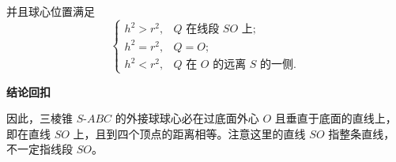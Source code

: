 \begin{proofbox}
	并且球心位置满足
	\[
		\begin{cases}
			h^{2}>r^{2}, & Q \text{ 在线段 } SO \text{ 上};               \\[4pt]
			h^{2}=r^{2}, & Q=O;                                       \\[4pt]
			h^{2}<r^{2}, & Q \text{ 在 } O \text{ 的远离 } S \text{ 的一侧}.
		\end{cases}
	\]

	\medskip
	\textbf{\textcolor{CProof}{结论回扣}}

	因此，三棱锥 $S$-$ABC$ 的外接球球心必在过底面外心 $O$ 且垂直于底面的直线上，即在直线 $SO$ 上，且到四个顶点的距离相等。注意这里的直线 $SO$ 指整条直线，不一定指线段 $SO$。
\end{proofbox}